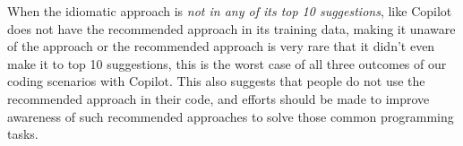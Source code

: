 When the idiomatic approach is \emph{not in any of its top 10 suggestions}, \cct{} like Copilot does not have the recommended approach in its training data, making it unaware of the approach or the recommended approach is very rare that it didn't even make it to top 10 suggestions, this is the worst case of all three outcomes of our coding scenarios with Copilot. 
This also suggests that people do not use the recommended approach in their code, and efforts should be made to improve awareness of such recommended approaches to solve those common programming tasks.